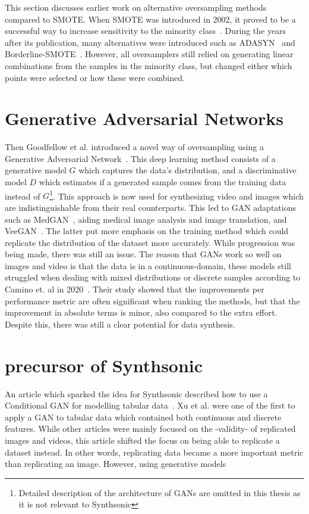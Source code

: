 This section discusses earlier work on alternative oversampling methods compared to SMOTE. When SMOTE was introduced in 2002, it proved to be a successful way to increase sensitivity to the minority class~\cite{Chawla2002SMOTE:Technique}. During the years after its publication, many alternatives were introduced such as ADASYN~\cite{He2008ADASYN:Learning} and Borderline-SMOTE~\cite{Han2005Borderline-SMOTE:Learning}. However, all oversamplers still relied on generating linear combinations from the samples in the minority class, but changed either which points were selected or how these were combined. 


\section{Generative Adversarial Networks}
Then Goodfellow et al. introduced a novel way of oversampling using a Generative Adversarial Network~\cite{Goodfellow2014GenerativeNets}. This deep learning method consists of a generative model $G$ which captures the data's distribution, and a discriminative model $D$ which estimates if a generated sample comes from the training data instead of $G$\footnote{Detailed description of the architecture of GANs are omitted in this thesis as it is not relevant to Synthsonic}. This approach is now used for synthesizing video and images which are indistinguishable from their real counterparts. This led to GAN adaptations such as MedGAN~\cite{Armanious2018MedGAN:GANs}, aiding medical image analysis and image translation, and VeeGAN~\cite{Srivastava2017VEEGAN:Learning}. The latter put more emphasis on the training method which could replicate the distribution of the dataset more accurately. While progression was being made, there was still an issue. The reason that GANs work so well on images and video is that the data is in a continuous-domain, these models still struggled when dealing with mixed distributions or discrete samples according to Camino et. al in 2020~\cite{Camino2020OversamplingEffort}. Their study showed that the improvements per performance metric are often significant when ranking the methods, but that the improvement in absolute terms is minor, also compared to the extra effort. Despite this, there was still a clear potential for data synthesis. 

\section{precursor of Synthsonic}
An article which sparked the idea for Synthsonic described how to use a Conditional GAN for modelling tabular data~\cite{Xu2019ModelingGAN}. Xu et al. were one of the first to apply a GAN to tabular data which contained both continuous and discrete features. While other articles were mainly focused on the -validity- of replicated images and videos, this article shifted the focus on being able to replicate a dataset instead. In other words, replicating data became a more important metric than replicating an image. However, using generative models 

